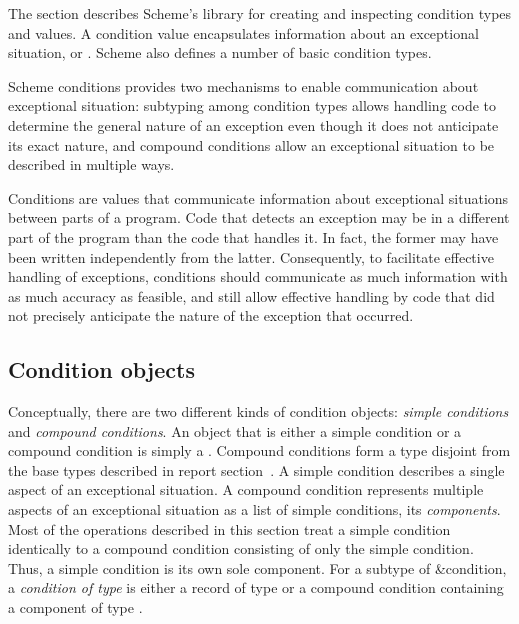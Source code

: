 The section describes Scheme's  library 
for creating and inspecting
condition types and values. A condition value encapsulates information
about an exceptional situation, or
. Scheme also defines a
number of basic condition types.

Scheme conditions provides two mechanisms to enable communication
about exceptional situation: subtyping among condition types allows
handling code to determine the general nature of an exception even
though it does not anticipate its exact nature, and compound
conditions allow an exceptional situation to be described in multiple
ways.

\begin{rationale}
Conditions are values that communicate information about exceptional
situations between parts of a program. Code that detects an exception
may be in a different part of the program than the code that handles
it. In fact, the former may have been written independently from the
latter. Consequently, to facilitate effective handling of exceptions,
conditions should communicate as much information with as much accuracy
as feasible, and still allow effective handling by code
that did not precisely anticipate the nature of the exception that
occurred.
\end{rationale}

\subsection{Condition objects}

Conceptually, there are two different kinds of condition objects:
\textit{simple conditions} and
\textit{compound conditions}.  An object
that is either a simple condition or a compound condition is 
simply a .  Compound conditions form a type disjoint
from the base types described in report
section~.  A simple condition
describes a single aspect of an exceptional situation.  A compound
condition represents multiple aspects of an exceptional situation as a
list of simple conditions, its \textit{components}.  Most of the
operations described in this section treat a simple condition
identically to a compound condition consisting of only the simple
condition.  Thus, a simple condition is its own sole component.  For a
subtype  of {\cf\&condition}, a \textit{condition of type
  } is either a record of type  or a compound condition
containing a component of type .

